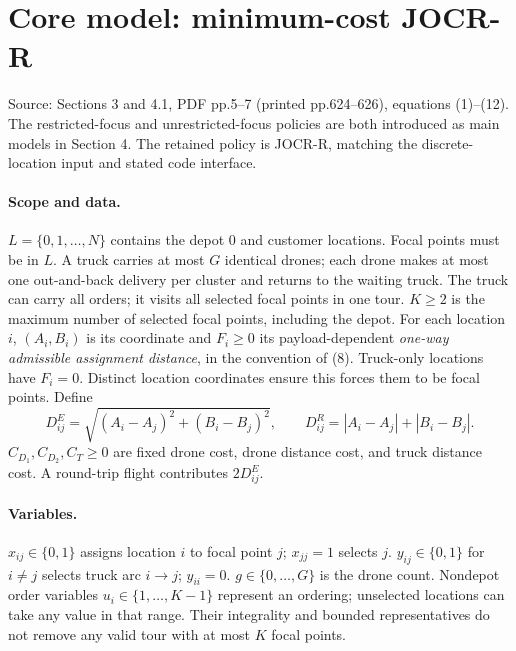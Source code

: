 \documentclass[11pt]{article}
\begin{document}
\section*{Core model: minimum-cost JOCR-R}
Source: Sections 3 and 4.1, PDF pp.5--7 (printed pp.624--626),
equations (1)--(12). The restricted-focus and unrestricted-focus policies
are both introduced as main models in Section 4. The retained policy is
JOCR-R, matching the discrete-location input and stated code interface.
\paragraph{Scope and data.}
$L=\{0,1,\ldots,N\}$ contains the depot $0$ and customer locations.
Focal points must be in $L$. A truck carries at most $G$ identical drones;
each drone makes at most one out-and-back delivery per cluster and
returns to the waiting truck. The truck can carry all orders; it visits
all selected focal points in one tour. $K\ge2$ is the maximum number
of selected focal points, including the depot. For each location $i$,
$(A_i,B_i)$ is its coordinate and $F_i\ge0$ its payload-dependent
\emph{one-way admissible assignment distance}, in the convention of (8).
Truck-only locations have $F_i=0$. Distinct location coordinates ensure
this forces them to be focal points. Define
\[
 D^E_{ij}=\sqrt{(A_i-A_j)^2+(B_i-B_j)^2},\qquad
 D^R_{ij}=|A_i-A_j|+|B_i-B_j|.
\]
$C_{D_1},C_{D_2},C_T\ge0$ are fixed drone cost, drone distance cost,
and truck distance cost. A round-trip flight contributes $2D^E_{ij}$.
\paragraph{Variables.}
$x_{ij}\in\{0,1\}$ assigns location $i$ to focal point $j$;
$x_{jj}=1$ selects $j$. $y_{ij}\in\{0,1\}$ for $i\ne j$ selects
truck arc $i\to j$; $y_{ii}=0$.
$g\in\{0,\ldots,G\}$ is the drone count. Nondepot order variables
$u_i\in\{1,\ldots,K-1\}$ represent an ordering; unselected locations
can take any value in that range. Their integrality and bounded
representatives do not remove any valid tour with at most $K$ focal points.
\end{document}
